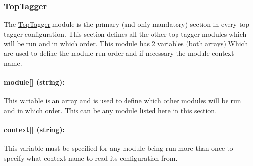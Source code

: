 \subsubsection*{\hyperlink{classTopTagger}{Top\-Tagger}}

The \hyperlink{classTopTagger}{Top\-Tagger} module is the primary (and only mandatory) section in every top tagger configuration. This section defines all the other top tagger modules which will be run and in which order. This module has 2 variables (both arrays) Which are used to define the module run order and if necessary the module context name.

\paragraph*{module\mbox{[}\mbox{]} (string)\-:}

This variable is an array and is used to define which other modules will be run and in which order. This can be any module listed here in this section.

\paragraph*{context\mbox{[}\mbox{]} (string)\-:}

This variable must be specified for any module being run more than once to specify what context name to read its configuration from. 